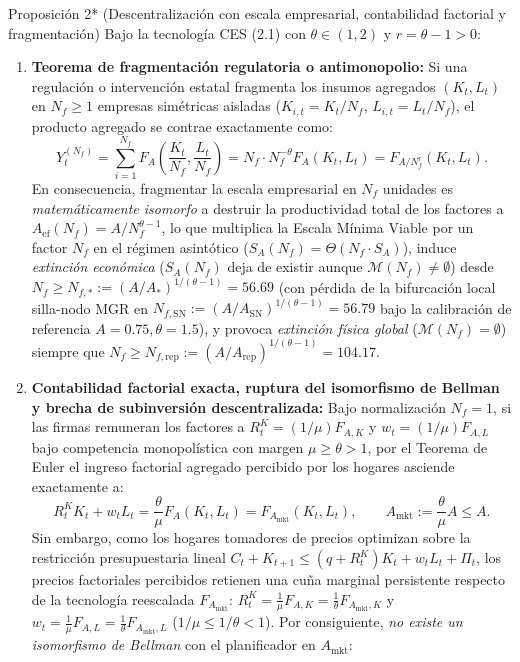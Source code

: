 \documentclass[11pt,letterpaper]{article}
\theoremstyle{plain}
\newtheorem*{namedthm}{\protect\namedthmname}
\newcommand{\namedthmname}{}
\newenvironment{thm_box}[1]{\renewcommand{\namedthmname}{#1}\begin{namedthm}}{\end{namedthm}}
\begin{document}
\begin{thm_box}{Proposición 2* (Descentralización con escala empresarial, contabilidad factorial y fragmentación)}
Bajo la tecnología CES (2.1) con $\theta\in(1,2)$ y $r=\theta-1>0$:
\begin{enumerate}
\item \textbf{Teorema de fragmentación regulatoria o antimonopolio:} Si una regulación o intervención estatal fragmenta los insumos agregados $(K_t,L_t)$ en $N_f\ge 1$ empresas simétricas aisladas ($K_{i,t}=K_t/N_f$, $L_{i,t}=L_t/N_f$), el producto agregado se contrae exactamente como:
\[
Y_t^{(N_f)} = \sum_{i=1}^{N_f} F_A\!\left(\frac{K_t}{N_f},\frac{L_t}{N_f}\right) = N_f \cdot N_f^{-\theta} F_A(K_t,L_t) = F_{A/N_f^r}(K_t,L_t).
\]
En consecuencia, fragmentar la escala empresarial en $N_f$ unidades es \emph{matemáticamente isomorfo} a destruir la productividad total de los factores a $A_{\mathrm{ef}}(N_f)=A/N_f^{\theta-1}$, lo que multiplica la Escala Mínima Viable por un factor $N_f$ en el régimen asintótico ($S_A(N_f)=\Theta(N_f\cdot S_A)$), induce \emph{extinción económica} ($S_A(N_f)$ deja de existir aunque $\mathcal{M}(N_f)\neq\emptyset$) desde $N_f\ge N_{f,*}:=(A/A_*)^{1/(\theta-1)}=56.69$ (con pérdida de la bifurcación local silla-nodo MGR en $N_{f,\mathrm{SN}}:=(A/A_{\mathrm{SN}})^{1/(\theta-1)}=56.79$ bajo la calibración de referencia $A=0.75, \theta=1.5$), y provoca \emph{extinción física global} ($\mathcal{M}(N_f)=\emptyset$) siempre que $N_f\ge N_{f,\mathrm{rep}}:=(A/A_{\mathrm{rep}})^{1/(\theta-1)}=104.17$.
\item \textbf{Contabilidad factorial exacta, ruptura del isomorfismo de Bellman y brecha de subinversión descentralizada:} Bajo normalización $N_f=1$, si las firmas remuneran los factores a $R_t^K=(1/\mu)F_{A,K}$ y $w_t=(1/\mu)F_{A,L}$ bajo competencia monopolística con margen $\mu\ge\theta>1$, por el Teorema de Euler el ingreso factorial agregado percibido por los hogares asciende exactamente a:
\[
R_t^K K_t + w_t L_t = \frac{\theta}{\mu} F_A(K_t,L_t) = F_{A_{\mathrm{mkt}}}(K_t,L_t), \qquad A_{\mathrm{mkt}} := \frac{\theta}{\mu} A \le A.
\]
Sin embargo, como los hogares tomadores de precios optimizan sobre la restricción presupuestaria lineal $C_t+K_{t+1}\le (q+R_t^K)K_t+w_t L_t+\Pi_t$, los precios factoriales percibidos retienen una cuña marginal persistente respecto de la tecnología reescalada $F_{A_{\mathrm{mkt}}}$: $R_t^K=\frac{1}{\mu}F_{A,K}=\frac{1}{\theta}F_{A_{\mathrm{mkt}},K}$ y $w_t=\frac{1}{\mu}F_{A,L}=\frac{1}{\theta}F_{A_{\mathrm{mkt}},L}$ ($1/\mu\le 1/\theta<1$). Por consiguiente, \emph{no existe un isomorfismo de Bellman} con el planificador en $A_{\mathrm{mkt}}$:

\end{enumerate}
\end{thm_box}
\end{document}
